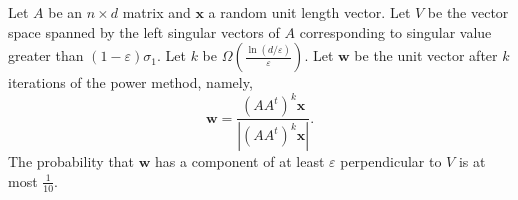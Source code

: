 \begin{theorem} \label{thm: Pr 1/10}
  Let \(A\) be an \(n \times d\) matrix and \(\mathbf{x} \) a random unit length vector. Let \(V\) be the vector space spanned by the left singular vectors of \(A\) corresponding to singular value greater than \((1 - \varepsilon )\sigma _1\). Let \(k\) be \(\Omega \left( \frac{\ln \left( d / \varepsilon  \right) }{\varepsilon } \right). \) Let \(\mathbf{w} \) be the unit vector after \(k\) iterations of the power method, namely, 
  \[
    \mathbf{w} = \frac{\left( A A^t \right)^k \mathbf{x}  }{\left\vert \left( A A^t \right)^k \mathbf{x}   \right\vert }.
  \]      The probability that \(\mathbf{w} \) has a component of at least \(\varepsilon \) perpendicular to \(V\) is at most \(\frac{1}{10}\).        
\end{theorem}


